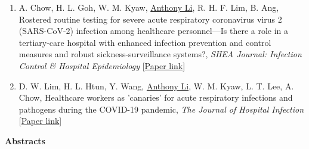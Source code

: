 \documentclass[letterpaper,10pt,oneside]{article}
\begin{document}
\begin{body}
\begin{enumerate}
\item A. Chow, H. L. Goh, W. M. Kyaw, \underline{Anthony Li}, R. H. F. Lim, B. Ang, \textcolor{mygray}{Rostered routine testing for severe acute respiratory coronavirus virus 2 (SARS-CoV-2) infection among healthcare personnel—Is there a role in a tertiary-care hospital with enhanced infection prevention and control measures and robust sickness-surveillance systems?}, \textit{SHEA Journal: Infection Control \& Hospital Epidemiology} [\href{https://www.cambridge.org/core/journals/infection-control-and-hospital-epidemiology/article/rostered-routine-testing-for-severe-acute-respiratory-coronavirus-virus-2-sarscov2-infection-among-healthcare-personnelis-there-a-role-in-a-tertiarycare-hospital-with-enhanced-infection-prevention-and-control-measures-and-robust-sicknesssurveillance-systems/30E175AEA1FBA0080DBB281D436D477B}{Paper link}]

\item D. W. Lim, H. L. Htun, Y. Wang, \underline{Anthony Li}, W. M. Kyaw, L. T. Lee, A. Chow, \textcolor{mygray}{Healthcare workers as 'canaries' for acute respiratory infections and pathogens during the COVID-19 pandemic}, \textit{The Journal of Hospital Infection} [\href{https://www.journalofhospitalinfection.com/article/S0195-6701(21)00140-7/fulltext}{Paper link}]


\end{enumerate}

\textbf{Abstracts}
\GapNoBreak
{}

\begin{enumerate}


\end{enumerate}
\end{body}
\end{document}
